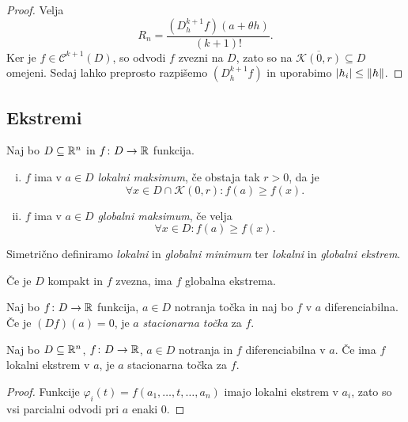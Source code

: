 \begin{proof}
Velja
\[
R_n = \frac{(D_h^{k+1}f)(a + \theta h)}{(k+1)!}.
\]
Ker je $f \in \mathcal{C}^{k+1}(D)$, so odvodi $f$ zvezni na $D$,
zato so na $\overline{\mathcal{K}(0,r)} \subseteq D$ omejeni. Sedaj
lahko preprosto razpišemo $(D_h^{k+1}f)$ in uporabimo
$\left\lvert h_i\right\rvert \leq \left\lVert h\right\rVert$.
\end{proof}

\newpage

\subsection{Ekstremi}

\begin{definicija}
Naj bo $D \subseteq \mathbb{R}^n$ in $f \colon D \to \mathbb{R}$ funkcija.

\begin{enumerate}[i)]
\item $f$ ima v $a \in D$ \emph{lokalni maksimum}, če obstaja tak
$r > 0$,
da je
\[
\forall x \in D \cap \mathcal{K}(0,r) \colon f(a) \geq f(x).
\]
\item $f$ ima v $a \in D$ \emph{globalni maksimum}, če velja
\[
\forall x \in D \colon f(a) \geq f(x).
\]
\end{enumerate}

Simetrično definiramo \emph{lokalni} in \emph{globalni minimum} ter
\emph{lokalni} in
\emph{globalni ekstrem}.
\end{definicija}

\begin{opomba}
Če je $D$ kompakt in $f$ zvezna, ima $f$ globalna ekstrema.
\end{opomba}

\begin{definicija}
Naj bo $f \colon D \to \mathbb{R}$ funkcija, $a \in D $ notranja točka in
naj bo $f$ v $a$ diferenciabilna. Če je $(Df)(a) = 0$, je $a$
\emph{stacionarna točka} za
$f$.
\end{definicija}


\begin{trditev}
Naj bo $D \subseteq \mathbb{R}^n$, $f \colon D \to \mathbb{R}$, $a \in D$
notranja in $f$ diferenciabilna v $a$. Če ima $f$ lokalni ekstrem
v $a$, je $a$ stacionarna točka za $f$.
\end{trditev}

\begin{proof}
Funkcije $\varphi_i(t) = f(a_1,\dots,t,\dots,a_n)$ imajo lokalni
ekstrem v $a_i$, zato so vsi parcialni odvodi pri $a$ enaki $0$.
\end{proof}

